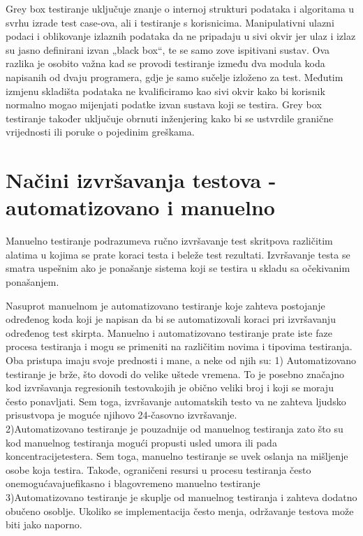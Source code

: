 \documentclass[12pt,oneside]{memoir}
\begin{document}
Grey box testiranje uključuje znanje o internoj strukturi podataka i algoritama u svrhu izrade test case-ova, ali i testiranje s korisnicima. Manipulativni ulazni podaci i oblikovanje izlaznih podataka da ne pripadaju u sivi okvir jer ulaz i izlaz su jasno definirani izvan „black box“, te se samo zove ispitivani sustav. Ova razlika je osobito važna kad se provodi testiranje između dva modula koda napisanih od dvaju programera, gdje je samo sučelje izloženo za test. Međutim izmjenu skladišta podataka ne kvalificiramo kao sivi okvir kako bi korisnik normalno mogao mijenjati podatke izvan sustava koji se testira. Grey box testiranje također uključuje obrnuti inženjering kako bi se ustvrdile granične vrijednosti ili poruke o pojedinim greškama.
\section{Načini izvršavanja testova - automatizovano i manuelno} \label{broj4}
Manuelno  testiranje podrazumeva  ručno  izvršavanje  test  skritpova  različitim  alatima  u kojima  se prate  koraci  testa
i beleže test rezultati. Izvršavanje testa se smatra uspešnim ako je 
ponašanje sistema koji se testira u skladu sa očekivanim ponašanjem.
\par
Nasuprot manuelnom je automatizovano testiranje koje zahteva postojanje određenog koda koji je napisan da bi se automatizovali koraci pri izvršavanju određenog test skirpta. Manuelno i automatizovano testiranje prate iste faze procesa testiranja
i mogu se primeniti na različitim novima i tipovima testiranja.
Oba pristupa imaju svoje prednosti i mane, a neke od 
njih su:
1) 
Automatizovano testiranje je brže, što dovodi do velike uštede vremena. To
je posebno značajno kod izvršavanja regresionih testovakojih je obično veliki broj i koji se moraju često ponavljati. Sem toga, izvršavanje automatskih testo
va ne zahteva ljudsko prisustvopa je moguće njihovo 24-časovno izvršavanje.\\
2)Automatizovano  testiranje  je  pouzadnije  od  manuelnog  testiranja
zato  što  su  kod manuelnog  testiranja  mogući propusti  usled  umora  ili  pada  koncentracijetestera.  Sem  toga, manuelno testiranje se uvek oslanja na mišljenje osobe koja testira. Takođe, ograničeni resursi u procesu testiranja često onemogućavajuefikasno i blagovremeno manuelno testiranje\\
3)Automatizovano testiranje je skuplje od manuelnog testiranja i zahteva dodatno obučeno osoblje. Ukoliko se implementacija često menja, održavanje
testova može biti jako naporno. \\
\end{document}
